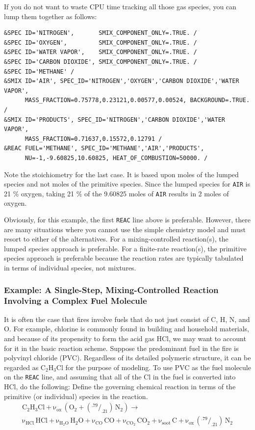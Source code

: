 \documentclass[11pt]{book}
\newcommand{\ct}{\tt\small}
\begin{document}
\noindent If you do not want to waste CPU time tracking all those gas species, you can lump them together as follows:

\footnotesize
\begin{verbatim}
&SPEC ID='NITROGEN',       SMIX_COMPONENT_ONLY=.TRUE. /
&SPEC ID='OXYGEN',         SMIX_COMPONENT_ONLY=.TRUE. /
&SPEC ID='WATER VAPOR',    SMIX_COMPONENT_ONLY=.TRUE. /
&SPEC ID='CARBON DIOXIDE', SMIX_COMPONENT_ONLY=.TRUE. /
&SPEC ID='METHANE' /
&SMIX ID='AIR', SPEC_ID='NITROGEN','OXYGEN','CARBON DIOXIDE','WATER VAPOR',
      MASS_FRACTION=0.75778,0.23121,0.00577,0.00524, BACKGROUND=.TRUE. /
&SMIX ID='PRODUCTS', SPEC_ID='NITROGEN','CARBON DIOXIDE','WATER VAPOR',
      MASS_FRACTION=0.71637,0.15572,0.12791 /
&REAC FUEL='METHANE', SPEC_ID='METHANE','AIR','PRODUCTS',
      NU=-1,-9.60825,10.60825, HEAT_OF_COMBUSTION=50000. /
\end{verbatim} \normalsize

\noindent
Note the stoichiometry for the last case.  It is based upon moles of the lumped species and not moles of the primitive species.
Since the lumped species for {\ct AIR} is 21 \% oxygen, taking 21 \% of the 9.60825 moles of {\ct AIR} results in 2 moles of oxygen.

Obviously, for this example, the first {\ct REAC} line above is preferable. However, there are many situations where you cannot use the simple chemistry model and
must resort to either of the alternatives. For a mixing-controlled reaction(s), the lumped species approach is preferable. For a finite-rate reaction(s), the primitive
species approach is preferable because the reaction rates are typically tabulated in terms of individual species, not mixtures.


\subsubsection{Example: A Single-Step, Mixing-Controlled Reaction Involving a Complex Fuel Molecule}

It is often the case that fires involve fuels that do not just consist of C, H, N, and O. For example, chlorine is commonly found in building and household materials, and because
of its propensity to form the acid gas HCl, we may want to account for it in the basic reaction scheme. Suppose the predominant fuel in the fire is polyvinyl chloride (PVC). Regardless
of its detailed polymeric structure, it can be regarded as C$_2$H$_3$Cl for the purpose of modeling. To use PVC as the fuel molecule on the {\ct REAC} line, and assuming
that all of the Cl in the fuel is converted into HCl, do the following:
Define the governing chemical reaction in terms of the primitive (or individual) species in the reaction.
\begin{eqnarray}\label{eq:PVC_reac}
\mathrm{C_2H_3Cl + \nu_{ox} \, (O_2+(^{.79}/_{.21}) \, N_2)} \rightarrow \\
\nonumber \mathrm{\nu_{HCl} \, HCl + \nu_{H_2O}\, H_2O + \nu_{CO}\, CO + \nu_{CO_2}\, CO_2 + \nu_{soot}\, C + \nu_{ox} \,(^{.79}/_{.21}) \, N_2}
\end{eqnarray}
\end{document}
